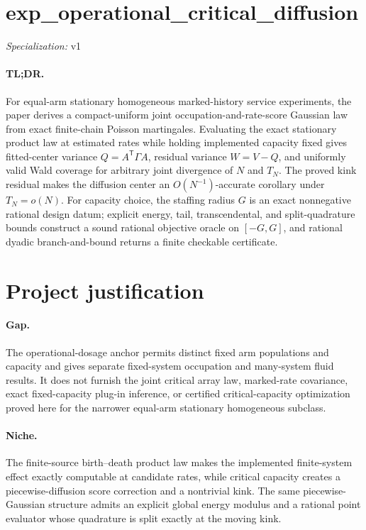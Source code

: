 \documentclass{article}
\begin{document}
\sloppy

\section*{exp\_\allowbreak{}operational\_\allowbreak{}critical\_\allowbreak{}diffusion}

\noindent\textit{Specialization:} v1\par

\paragraph{TL;DR.} For equal-arm stationary homogeneous marked-history service experiments, the paper derives a compact-uniform joint occupation-and-rate-score Gaussian law from exact finite-chain Poisson martingales. Evaluating the exact stationary product law at estimated rates while holding implemented capacity fixed gives fitted-center variance \(Q=A^{\mathsf T}\Gamma A\), residual variance \(W=V-Q\), and uniformly valid Wald coverage for arbitrary joint divergence of \(N\) and \(T_N\). The proved kink residual makes the diffusion center an \(O(N^{-1})\)-accurate corollary under \(T_N=o(N)\). For capacity choice, the staffing radius \(G\) is an exact nonnegative rational design datum; explicit energy, tail, transcendental, and split-quadrature bounds construct a sound rational objective oracle on \([-G,G]\), and rational dyadic branch-and-bound returns a finite checkable certificate.

\section{Project justification}

\paragraph{Gap.} The operational-dosage anchor permits distinct fixed arm populations and capacity and gives separate fixed-system occupation and many-system fluid results. It does not furnish the joint critical array law, marked-rate covariance, exact fixed-capacity plug-in inference, or certified critical-capacity optimization proved here for the narrower equal-arm stationary homogeneous subclass.

\paragraph{Niche.} The finite-source birth--death product law makes the implemented finite-system effect exactly computable at candidate rates, while critical capacity creates a piecewise-diffusion score correction and a nontrivial kink. The same piecewise-Gaussian structure admits an explicit global energy modulus and a rational point evaluator whose quadrature is split exactly at the moving kink.
\end{document}
